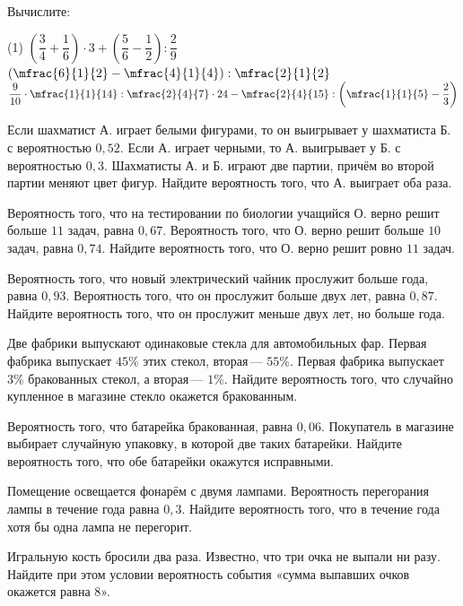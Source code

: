 \begin{class}[number=2]
	\begin{listofex}
		\item Вычислите:
		\begin{tasks}(1)
			\task \( \left( \dfrac{3}{4}+\dfrac{1}{6} \right)\cdot3+\left( \dfrac{5}{6}-\dfrac{1}{2} \right):\dfrac{2}{9} \)
			\task \( \left( \mfrac{6}{1}{2}-\mfrac{4}{1}{4} \right):\mfrac{2}{1}{2} \)
			\task \( \dfrac{9}{10}\cdot\mfrac{1}{1}{14}:\mfrac{2}{4}{7}\cdot24-\mfrac{2}{4}{15}:\left( \mfrac{1}{1}{5}-\dfrac{2}{3} \right) \)
		\end{tasks}
		\item Если шахматист А. играет белыми фигурами, то он выигрывает у шахматиста Б. с вероятностью \( 0,52 \). Если А. играет черными, то А. выигрывает у Б. с вероятностью \( 0,3 \). Шахматисты А. и Б. играют две партии, причём во второй партии меняют цвет фигур. Найдите вероятность того, что А. выиграет оба раза.
		\item Вероятность того, что на тестировании по биологии учащийся О. верно решит больше \( 11 \) задач, равна \( 0,67 \). Вероятность того, что О. верно решит больше \( 10 \) задач, равна \( 0,74 \). Найдите вероятность того, что О. верно решит ровно \( 11 \) задач.
		\item Вероятность того, что новый электрический чайник прослужит больше года, равна \( 0,93 \). Вероятность того, что он прослужит больше двух лет, равна \( 0,87 \). Найдите вероятность того, что он прослужит меньше двух лет, но больше года.
		\item Две фабрики выпускают одинаковые стекла для автомобильных фар. Первая фабрика выпускает \( 45\% \) этих стекол, вторая --- \( 55\% \). Первая фабрика выпускает \( 3\% \) бракованных стекол, а вторая --- \( 1\% \). Найдите вероятность того, что случайно купленное в магазине стекло окажется бракованным.
		\item Вероятность того, что батарейка бракованная, равна \( 0,06 \). Покупатель в магазине выбирает случайную упаковку, в которой две таких батарейки. Найдите вероятность того, что обе батарейки окажутся исправными.
		\item Помещение освещается фонарём с двумя лампами. Вероятность перегорания лампы в течение года равна \( 0,3 \). Найдите вероятность того, что в течение года хотя бы одна лампа не перегорит.
		\item Игральную кость бросили два раза. Известно, что три очка не выпали ни разу. Найдите при этом условии вероятность события «сумма выпавших очков окажется равна \( 8 \)».

\end{listofex}
\end{class}
